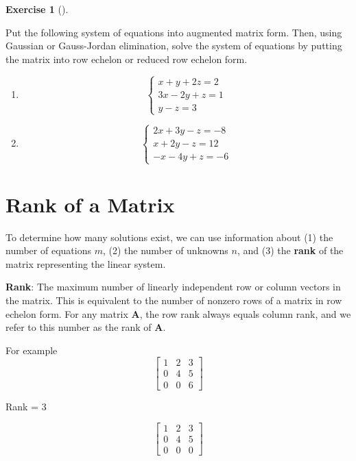 \documentclass[
  letterpaper,
]{book}
\providecommand{\tightlist}{%
  \setlength{\itemsep}{0pt}\setlength{\parskip}{0pt}}\usepackage{longtable,booktabs,array}
\theoremstyle{definition}
\theoremstyle{definition}
\theoremstyle{plain}
\theoremstyle{definition}
\newtheorem{exercise}{Exercise}[chapter]
\theoremstyle{plain}
\theoremstyle{plain}
\theoremstyle{remark}
\begin{document}
\leavevmode{}%
\begin{exercise}[]\label{exr-solvesys1}

Put the following system of equations into augmented matrix form. Then,
using Gaussian or Gauss-Jordan elimination, solve the system of
equations by putting the matrix into row echelon or reduced row echelon
form.

\begin{enumerate}
\def\labelenumi{\arabic{enumi}.}
\tightlist
\item
  \[ \begin{cases}
      x + y + 2z = 2\\
      3x - 2y + z = 1\\
      y - z = 3
   \end{cases}\]
\item
  \[ \begin{cases}
      2x + 3y - z = -8\\
      x + 2y - z = 12\\
    -x -4y + z = -6
   \end{cases}\]
\end{enumerate}

\end{exercise}

\hypertarget{rank-of-a-matrix}{%
\section{Rank of a Matrix}\label{rank-of-a-matrix}}

To determine how many solutions exist, we can use information about (1)
the number of equations \(m\), (2) the number of unknowns \(n\), and (3)
the \textbf{rank} of the matrix representing the linear system.

\textbf{Rank}: The maximum number of linearly independent row or column
vectors in the matrix. This is equivalent to the number of nonzero rows
of a matrix in row echelon form. For any matrix \textbf{A}, the row rank
always equals column rank, and we refer to this number as the rank of
\textbf{A}.

For example \[\begin{bmatrix} 1 & 2 & 3 \\
            0 & 4 & 5 \\
            0 & 0 & 6 \end{bmatrix}\]

Rank = 3

\[\begin{bmatrix} 1 & 2 & 3 \\ 
    0 & 4 & 5 \\
    0 & 0 & 0 \end{bmatrix}\]
\end{document}
